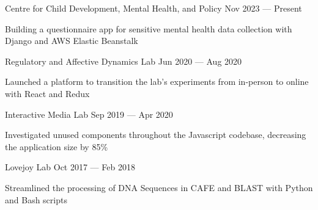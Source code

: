 \begin{cventries}
  \cventry
    {}
    {Centre for Child Development, Mental Health, and Policy}
    {}
    {Nov 2023 --- Present}
    {}
    {
      \begin{cvitems}
        \item {Building a questionnaire app for sensitive mental health data collection with Django and AWS Elastic Beanstalk}
      \end{cvitems}
    }
  \cventry
    {}
    {Regulatory and Affective Dynamics Lab}
    {}
    {Jun 2020 --- Aug 2020}
    {}
    {
      \begin{cvitems}
        \item {Launched a platform to transition the lab's experiments from in-person to online with React and Redux}
      \end{cvitems}
    }
  \cventry
    {}
    {Interactive Media Lab}
    {}
    {Sep 2019 --- Apr 2020}
    {}
    {
      \begin{cvitems}
        \item {Investigated unused components throughout the Javascript codebase, decreasing the application size by 85\% }
      \end{cvitems}
    }
  \cventry
    {}
    {Lovejoy Lab}
    {}
    {Oct 2017 --- Feb 2018}
    {}
    {
      \begin{cvitems}
        \item {Streamlined the processing of DNA Sequences in CAFE and BLAST with Python and Bash scripts}
      \end{cvitems}
    }
\end{cventries}